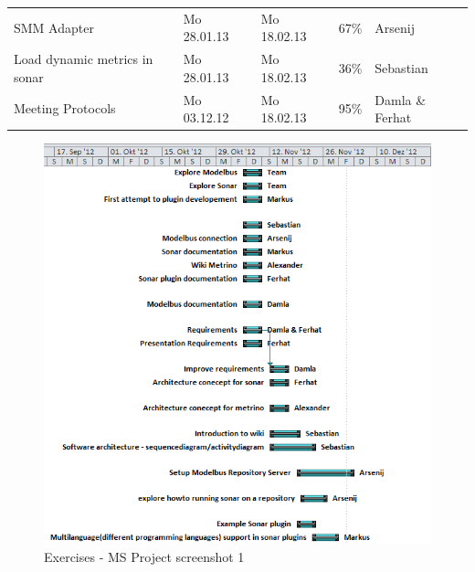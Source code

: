 \begin{longtable}{|p{6cm}|p{2.5cm}|p{2.5cm}|p{1.7cm}|p{1.8cm}|}
SMM Adapter                                                             & Mo 28.01.13 & Mo 18.02.13 & 67\%      & Arsenij                 \\ 
Load dynamic metrics in sonar                                           & Mo 28.01.13 & Mo 18.02.13 & 36\%      & Sebastian               \\ 
Meeting Protocols                                                       & Mo 03.12.12 & Mo 18.02.13 & 95\%      & Damla  \&  Ferhat       \\
\hline
\end{longtable}

\newpage

\begin{figure}[htb]
\begin{center}
\includegraphics[width=\textwidth]{msp_part1}
\caption{Exercises - MS Project screenshot 1}
\end{center}
\end{figure}

\newpage

